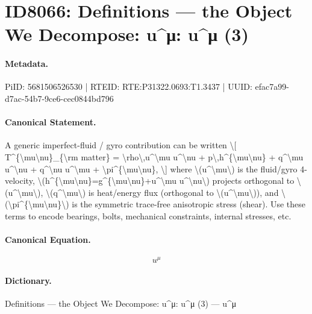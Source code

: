 \section*{ID8066: Definitions — the Object We Decompose: u\textasciicircum{}μ: u\textasciicircum{}μ (3)}
\paragraph{Metadata.}
PiID: 5681506526530 | RTEID: RTE:P31322.0693:T1.3437 | UUID: efac7a99-d7ac-54b7-9ce6-cec0844bd796

\paragraph{Canonical Statement.}
A generic imperfect-fluid / gyro contribution can be written \textbackslash{}[ T\textasciicircum{}\{\textbackslash{}mu\textbackslash{}nu\}\_\{\textbackslash{}rm matter\} = \textbackslash{}rho\textbackslash{},u\textasciicircum{}\textbackslash{}mu u\textasciicircum{}\textbackslash{}nu + p\textbackslash{},h\textasciicircum{}\{\textbackslash{}mu\textbackslash{}nu\} + q\textasciicircum{}\textbackslash{}mu u\textasciicircum{}\textbackslash{}nu + q\textasciicircum{}\textbackslash{}nu u\textasciicircum{}\textbackslash{}mu + \textbackslash{}pi\textasciicircum{}\{\textbackslash{}mu\textbackslash{}nu\}, \textbackslash{}] where \textbackslash{}(u\textasciicircum{}\textbackslash{}mu\textbackslash{}) is the fluid/gyro 4-velocity, \textbackslash{}(h\textasciicircum{}\{\textbackslash{}mu\textbackslash{}nu\}=g\textasciicircum{}\{\textbackslash{}mu\textbackslash{}nu\}+u\textasciicircum{}\textbackslash{}mu u\textasciicircum{}\textbackslash{}nu\textbackslash{}) projects orthogonal to \textbackslash{}(u\textasciicircum{}\textbackslash{}mu\textbackslash{}), \textbackslash{}(q\textasciicircum{}\textbackslash{}mu\textbackslash{}) is heat/energy flux (orthogonal to \textbackslash{}(u\textasciicircum{}\textbackslash{}mu\textbackslash{})), and \textbackslash{}(\textbackslash{}pi\textasciicircum{}\{\textbackslash{}mu\textbackslash{}nu\}\textbackslash{}) is the symmetric trace-free anisotropic stress (shear). Use these terms to encode bearings, bolts, mechanical constraints, internal stresses, etc.

\paragraph{Canonical Equation.}
\[
u^\mu
\]

\paragraph{Dictionary.}
Definitions — the Object We Decompose: u\textasciicircum{}μ: u\textasciicircum{}μ (3) — u\textasciicircum{}μ

